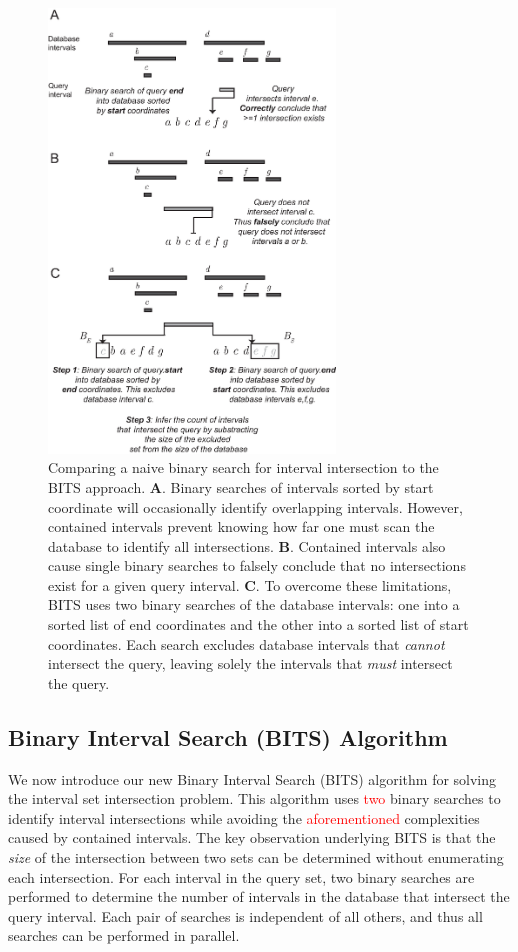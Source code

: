 \documentclass{bioinfo}
\begin{document}
\begin{figure}[h]
		\centering
		\includegraphics[width=3in]{Figure1.v3.eps}
		\caption{Comparing a naive binary search for interval 
		intersection to the BITS approach. \textbf{A}. Binary
		searches of intervals sorted by start coordinate will
		occasionally identify overlapping intervals. However,  
		contained intervals prevent knowing how far one must scan 
		the database to identify all intersections. \textbf{B}. Contained 
		intervals also cause single binary searches to 
		falsely conclude that no intersections exist for a given query 
		interval.  \textbf{C}. To overcome these limitations, BITS
		uses two binary searches of the database intervals: one
		into a sorted list of end coordinates and the other into a
		sorted list of start coordinates. Each search excludes database
		intervals that \emph{cannot} intersect the query, leaving solely the
		intervals that \emph{must} intersect the query.}
		\label{bitssearching}
\end{figure}

\subsection{Binary Interval Search (BITS) Algorithm}
We now introduce our new Binary Interval Search (BITS) algorithm for solving the
interval set intersection problem.  This algorithm uses \textcolor{red}{two} 
binary searches to identify interval intersections while avoiding the 
\textcolor{red}{aforementioned} complexities caused by contained intervals. 
The key observation underlying BITS 
is that the \emph{size} of the intersection between two sets can be determined 
without enumerating each intersection.  For each interval in the query set, two
binary searches are performed to determine the number of intervals in the
database that intersect the query interval.  Each pair of searches is
independent of all others, and thus all searches can be performed in parallel.  
\end{document}
